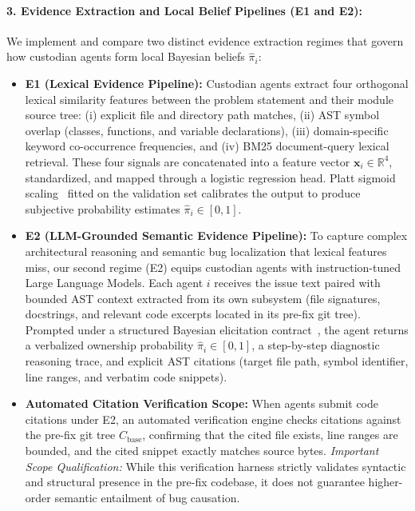 \documentclass{article}
\theoremstyle{definition}
\begin{document}
\paragraph{3. Evidence Extraction and Local Belief Pipelines (E1 and E2):}
We implement and compare two distinct evidence extraction regimes that govern how custodian agents form local Bayesian beliefs $\hat{\pi}_i$:
\begin{itemize}
    \item \textbf{E1 (Lexical Evidence Pipeline):} Custodian agents extract four orthogonal lexical similarity features between the problem statement and their module source tree: (i) explicit file and directory path matches, (ii) AST symbol overlap (classes, functions, and variable declarations), (iii) domain-specific keyword co-occurrence frequencies, and (iv) BM25 document-query lexical retrieval. These four signals are concatenated into a feature vector $\mathbf{x}_i \in \mathbb{R}^4$, standardized, and mapped through a logistic regression head. Platt sigmoid scaling~\cite{guo2017calibration} fitted on the validation set calibrates the output to produce subjective probability estimates $\hat{\pi}_i \in [0, 1]$.
    \item \textbf{E2 (LLM-Grounded Semantic Evidence Pipeline):} To capture complex architectural reasoning and semantic bug localization that lexical features miss, our second regime (E2) equips custodian agents with instruction-tuned Large Language Models. Each agent $i$ receives the issue text paired with bounded AST context extracted from its own subsystem (file signatures, docstrings, and relevant code excerpts located in its pre-fix git tree). Prompted under a structured Bayesian elicitation contract~\cite{xiong2024can}, the agent returns a verbalized ownership probability $\hat{\pi}_i \in [0, 1]$, a step-by-step diagnostic reasoning trace, and explicit AST citations (target file path, symbol identifier, line ranges, and verbatim code snippets).
    \item \textbf{Automated Citation Verification Scope:} When agents submit code citations under E2, an automated verification engine checks citations against the pre-fix git tree $C_{\mathrm{base}}$, confirming that the cited file exists, line ranges are bounded, and the cited snippet exactly matches source bytes. \emph{Important Scope Qualification:} While this verification harness strictly validates syntactic and structural presence in the pre-fix codebase, it does not guarantee higher-order semantic entailment of bug causation.
\end{itemize}
\end{document}

